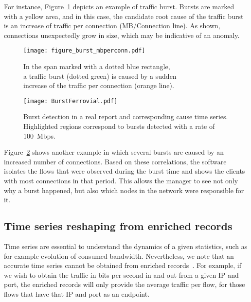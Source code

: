 \documentclass[AMA,STIX1COL]{WileyNJD-v2}
\begin{document}
For instance, Figure~\ref{fig:mbperconn} depicts an example of traffic burst. Bursts are marked with a yellow area, and in this case, the candidate root cause of the traffic burst is an increase of traffic per connection (MB/Connection line). As shown, connections unexpectedly grow in size, which may be indicative of an anomaly.

\begin{figure*}[b]
\vspace{-1em}
  \begin{subfigure}[tbp]{0.45\textwidth}
    \centering
\texttt{[image: figure\_burst\_mbperconn.pdf]}
    \caption{In the span marked with a dotted blue rectangle, \\ a traffic burst (dotted green) is caused by a sudden \\ increase of the traffic per connection (orange line).}
    \label{fig:mbperconn}
  \end{subfigure}
  \hfill %
  \begin{subfigure}[tbp]{0.55\textwidth}
      \centering
   \texttt{[image: BurstFerrovial.pdf]}
    \caption{Burst detection in a real report and corresponding cause time series. Highlighted regions correspond to bursts detected with a rate of 100~Mbps.}
        \label{fig:BurstsFerr}
  \end{subfigure}
  \caption{Real examples of traffic bursts.}
\end{figure*}

Figure~\ref{fig:BurstsFerr} shows another example in which  several bursts are caused by an increased number of connections. Based on these correlations, the software isolates the flows that were observed during the burst time and shows the clients with most connections in that period. This allows the manager to see not only why a burst happened, but also which nodes in the network were responsible for it.

\subsection{Time series reshaping from enriched records}

Time series are essential to understand the dynamics of a given statistics, such as for example evolution of consumed bandwidth. Nevertheless, we note that an accurate time series cannot be obtained from enriched records~\cite{NetFlowLossWin2002}. For example, if we wish to obtain the traffic in bits per second in and out from a given IP and port, the enriched records will only provide the average traffic per flow, for those flows that have that IP and port as an endpoint.
\end{document}
